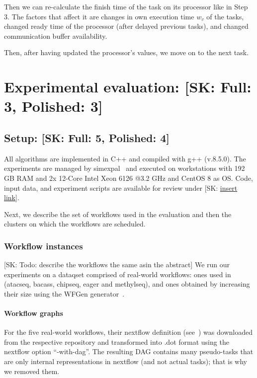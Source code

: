 \documentclass[conference]{IEEEtran}
\newcommand{\skug}[1]{{\color{blue}[SK: #1]}}
\newcommand{\hmey}[1]{{\color{red}[HM: #1]}}
\begin{document}
    Then we can re-calculate the finish time of the task on its processor like in Step 3.
    The factors that affect it are changes in own execution time $w_v$ of the tasks, changed ready time of the processor
    (after delayed previous tasks), and changed communication buffer availability.

    Then, after having updated the processor's values, we move on to the next task.



    \section{Experimental evaluation: \skug{Full: 3, Polished: 3}}
    \subsection{Setup: \skug{Full: 5, Polished: 4}}
    \label{sec:setup}

    All algorithms are implemented in C++ and compiled with g++ (v.8.5.0).
    The experiments are managed by simexpal~\cite{DBLP:journals/algorithms/AngrimanGLMNPT19} and executed on workstations with 192 GB RAM and 2x 12-Core Intel Xeon 6126 @3.2 GHz
    and CentOS 8 as OS.
    Code, input data, and experiment scripts are available for review under \skug{\url{insert link}}.

    Next, we describe the set of workflows used in the evaluation and then the clusters on which the
    workflows are scheduled.

    \subsubsection{Workflow instances}
    \skug{Todo: describe the workflows the same asin the abstract}
    We run our experiments on a dataqset comprised of real-world workflows: ones used in~\cite{lotaru} (atacseq, bacass, chipseq,
    eager and methylseq), and ones obtained by increasing their size using the WFGen generator~\cite{COLEMAN202216}.


    \paragraph{Workflow graphs}
    For the five real-world workflows, their nextflow definition (see~\cite{ewels2020nf}) was downloaded from the
    respective repository and transformed into .dot format using the nextflow option ``-with-dag''.
    The resulting DAG contains many pseudo-tasks that are only internal representations in nextflow
    (and not actual tasks); that is why we removed them.
\end{document}
